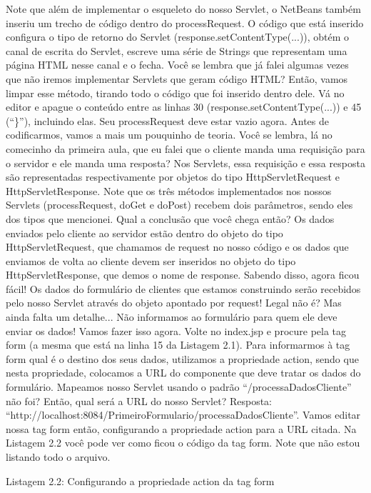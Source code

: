 Note que além de implementar o esqueleto do nosso Servlet, o NetBeans também inseriu um trecho de código dentro do processRequest. O código que está inserido configura o tipo de retorno do Servlet (response.setContentType(...)), obtém o canal de escrita do Servlet, escreve uma série de Strings que representam uma página HTML nesse canal e o fecha. Você se lembra que já falei algumas vezes que não iremos implementar Servlets que geram código HTML? Então, vamos limpar esse método, tirando todo o código que foi inserido dentro dele. Vá no editor e apague o conteúdo entre as linhas 30 (response.setContentType(...)) e 45 (“\}”), incluindo elas. Seu processRequest deve estar vazio agora.
Antes de codificarmos, vamos a mais um pouquinho de teoria. Você se lembra, lá no comecinho da primeira aula, que eu falei que o cliente manda uma requisição para o servidor e ele manda uma resposta? Nos Servlets, essa requisição e essa resposta são representadas respectivamente por objetos do tipo HttpServletRequest e HttpServletResponse. Note que os três métodos implementados nos nossos Servlets (processRequest, doGet e doPost) recebem dois parâmetros, sendo eles dos tipos que mencionei. Qual a conclusão que você chega então? Os dados enviados pelo cliente ao servidor estão dentro do objeto do tipo HttpServletRequest, que chamamos de request no nosso código e os dados que enviamos de volta ao cliente devem ser inseridos no objeto do tipo HttpServletResponse, que demos o nome de response.
Sabendo disso, agora ficou fácil! Os dados do formulário de clientes que estamos construindo serão recebidos pelo nosso Servlet através do objeto apontado por request! Legal não é? Mas ainda falta um detalhe... Não informamos ao formulário para quem ele deve enviar os dados! Vamos fazer isso agora. Volte no index.jsp e procure pela tag form (a mesma que está na linha 15 da Listagem 2.1). Para informarmos à tag form qual é o destino dos seus dados, utilizamos a propriedade action, sendo que nesta propriedade, colocamos a URL do componente que deve tratar os dados do formulário. Mapeamos nosso Servlet usando o padrão “/processaDadosCliente” não foi? Então, qual será a URL do nosso Servlet? Resposta: “http://localhost:8084/PrimeiroFormulario/processaDadosCliente”. Vamos editar nossa tag form então, configurando a propriedade action para a URL citada. Na Listagem 2.2 você pode ver como ficou o código da tag form. Note que não estou listando todo o arquivo.

Listagem 2.2: Configurando a propriedade action da tag form
 

